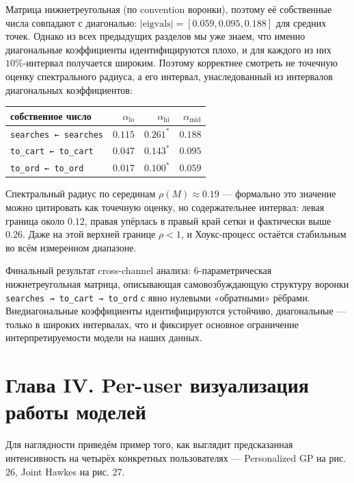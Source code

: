\documentclass[12pt,a4paper]{article}
\begin{document}
Матрица нижнетреугольная (по convention воронки), поэтому её собственные числа совпадают с диагональю: $|\mathrm{eigvals}| = [0.059, 0.095, 0.188]$ для средних точек. Однако из всех предыдущих разделов мы уже знаем, что именно диагональные коэффициенты идентифицируются плохо, и для каждого из них $10\%$-интервал получается широким. Поэтому корректнее смотреть не точечную оценку спектрального радиуса, а его интервал, унаследованный из интервалов диагональных коэффициентов:


\begin{table}[ht]
\centering
\small
\begin{tabular}{lrrr}
\toprule
собственное число & $\alpha _{\text{lo}}$ & $\alpha _{\text{hi}}$ & $\alpha _{\text{mid}}$ \\
\midrule
\texttt{searches ← searches} & $0.115$ & $0.261^{*}$ & $0.188$ \\
\texttt{to\_cart ← to\_cart} & $0.047$ & $0.143^{*}$ & $0.095$ \\
\texttt{to\_ord ← to\_ord} & $0.017$ & $0.100^{*}$ & $0.059$ \\
\bottomrule
\end{tabular}
\end{table}


Спектральный радиус по серединам $\rho (M) \approx  0.19$ --- формально это значение можно цитировать как точечную оценку, но содержательнее интервал: левая граница около $0.12$, правая упёрлась в правый край сетки и фактически выше $0.26$. Даже на этой верхней границе $\rho < 1$, и Хоукс-процесс остаётся стабильным во всём измеренном диапазоне.

Финальный результат cross-channel анализа: 6-параметрическая нижнетреугольная матрица, описывающая самовозбуждающую структуру воронки \texttt{searches → to\_cart → to\_ord} с явно нулевыми «обратными» рёбрами. Внедиагональные коэффициенты идентифицируются устойчиво, диагональные --- только в широких интервалах, что и фиксирует основное ограничение интерпретируемости модели на наших данных.

\FloatBarrier
\clearpage
\section{Глава IV. Per-user визуализация работы моделей}

Для наглядности приведём пример того, как выглядит предсказанная интенсивность на четырёх конкретных пользователях --- Personalized GP на рис. 26, Joint Hawkes на рис. 27.
\end{document}
